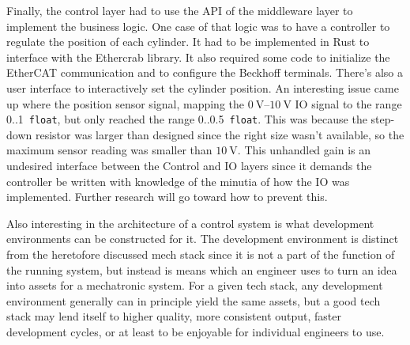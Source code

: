 \documentclass[english,12pt,a4paper,pdftex,eng,utf8]{aaltothesis}
\begin{document}
Finally, the control layer had to use the API of the middleware layer to implement the business logic. One case of that logic was to have a controller to regulate the position of each cylinder. It had to be implemented in Rust to interface with the Ethercrab library. It also required some code to initialize the EtherCAT communication and to configure the Beckhoff terminals. There's also a user interface to interactively set the cylinder position. An interesting issue came up where the position sensor signal, mapping the $\qtyrange[range-units=single,range-phrase=..]{0}{10}{\volt}$ IO signal to the range 0..1~\verb|float|, but only reached the range 0..0.5~\verb|float|. This was because the step-down resistor was larger than designed since the right size wasn't available, so the maximum sensor reading was smaller than $\qty{10}{\volt}$. This unhandled gain is an undesired interface between the Control and IO layers since it demands the controller be written with knowledge of the minutia of how the IO was implemented. Further research will go toward how to prevent this.

Also interesting in the architecture of a control system is what development environments can be constructed for it.  The development environment is distinct from the heretofore discussed mech stack since it is not a part of the function of the running system, but instead is means which an engineer uses to turn an idea into assets for a mechatronic system.  For a given tech stack, any development environment generally can in principle yield the same assets, but a good tech stack may lend itself to higher quality, more consistent output, faster development cycles, or at least to be enjoyable for individual engineers to use.
\end{document}
